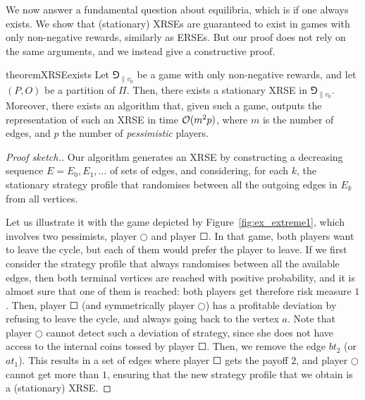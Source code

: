 We now answer a fundamental question about equilibria, which is if one always exists. 
We show that (stationary) XRSEs are guaranteed to exist in games with only non-negative rewards, similarly as ERSEs.
But our proof does not rely on the same arguments, and we instead give a constructive proof.

\begin{restatable}{theorem}{XRSEexists}\label{thm:XRSEexists}
    Let $\Game_{\|v_0}$ be a game with only non-negative rewards, and let $(P,O)$ be a partition of $\Pi$.
    Then, there exists a stationary XRSE in $\Game_{\|v_0}$.
    Moreover, there exists an algorithm that, given such a game, outputs the representation of such an XRSE in time $\mathcal{O}(m^2 p)$, where $m$ is the number of edges, and $p$ the number of \emph{pessimistic} players.
\end{restatable}

\begin{proof}[Proof sketch.]
    Our algorithm generates an XRSE by constructing a decreasing sequence $E = E_0, E_1, \dots$ of sets of edges, and considering, for each $k$, the stationary strategy profile that randomises between all the outgoing edges in $E_k$ from all vertices.
    
    Let us illustrate it with the game depicted by Figure~\ref{fig:ex_extreme1}, which involves two pessimists, player $\Circle$ and player $\Square$.
    In that game, both players want to leave the cycle, but each of them would prefer the player to leave.
    If we first consider the strategy profile that always randomises between all the available edges, then both terminal vertices are reached with positive probability, and it is almost sure that one of them is reached: both players get therefore risk measure $1$.
    Then, player $\Square$ (and symmetrically player $\Circle$) has a profitable deviation by refusing to leave the cycle, and always going back to the vertex $a$.
    Note that player $\Circle$ cannot detect such a deviation of strategy, since she does not have access to the internal coins tossed by player $\Square$. %
    Then, we remove the edge $bt_2$ (or $at_1$). This results in a set of edges where player $\Square$ gets the payoff $2$, and player $\Circle$ cannot get more than $1$, ensuring that the new strategy profile that we obtain is a (stationary) XRSE.
\end{proof}

